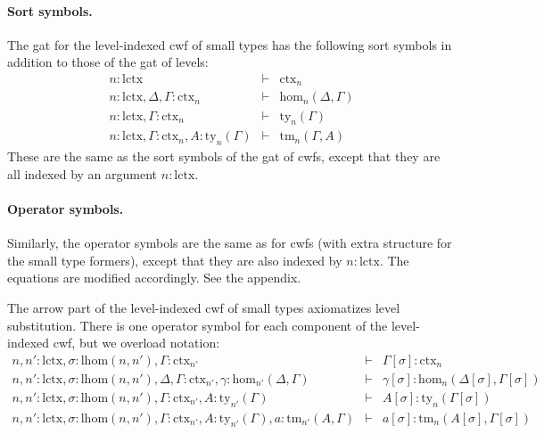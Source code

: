 \documentclass[11pt,a4paper]{article}
\theoremstyle{plain}
\theoremstyle{definition}
\def\lhom{\mathrm{lhom}}
\def\Hom{\mathrm{hom}}
\def\lctx{\mathrm{lctx}}
\newcommand{\ctx}{\mathrm{ctx}}
\newcommand{\ty}{\mathrm{ty}}
\newcommand{\tm}{\mathrm{tm}}
\begin{document}
\paragraph{Sort symbols.} The gat for the level-indexed cwf of small types has the following sort symbols in addition to those of the gat of levels:
\begin{eqnarray*}
n : \lctx &\vdash& \ctx_n\\
n : \lctx, \Delta, \Gamma : \ctx_n &\vdash& \Hom_n(\Delta,\Gamma)\\
n : \lctx, \Gamma : \ctx_n &\vdash& \ty_n(\Gamma)\\
n : \lctx, \Gamma : \ctx_n, A:\ty_n(\Gamma) &\vdash& \tm_n(\Gamma,A)
\end{eqnarray*}
These are the same as the sort symbols of the gat of cwfs, except that they are all indexed by an argument $n : \lctx$.

\paragraph{Operator symbols.} Similarly, the operator symbols are the same as for cwfs (with extra structure for the small type formers), except that they are also indexed by $n : \lctx$. The equations are modified accordingly. See the appendix.

The arrow part of the level-indexed cwf of small types axiomatizes level substitution. There is one operator symbol for each component of the level-indexed cwf, but we overload notation:
\begin{eqnarray*}
n, n' : \lctx , \sigma : \lhom(n,n'), \Gamma : \ctx_{n'} &\vdash& 
\Gamma[\sigma] : \ctx_n\\
n, n' : \lctx , \sigma : \lhom(n,n'), \Delta,\Gamma : \ctx_{n'}, \gamma : \Hom_{n'}(\Delta,\Gamma) 
&\vdash& 
\gamma[\sigma] : \Hom_{n}(\Delta[\sigma],\Gamma[\sigma]) \\
n, n' : \lctx , \sigma : \lhom(n,n'), \Gamma : \ctx_{n'}, A:\ty_{n'}(\Gamma)
&\vdash& 
A[\sigma]: \ty_n(\Gamma[\sigma])\\
n,n' : \lctx , \sigma : \lhom(n,n'), \Gamma : \ctx_{n'}, A:\ty_{n'}(\Gamma), a : \tm_{n'}(A,\Gamma) 
&\vdash& 
a[\sigma] : \tm_{n}(A[\sigma],\Gamma[\sigma]) 
\end{eqnarray*}
\end{document}
